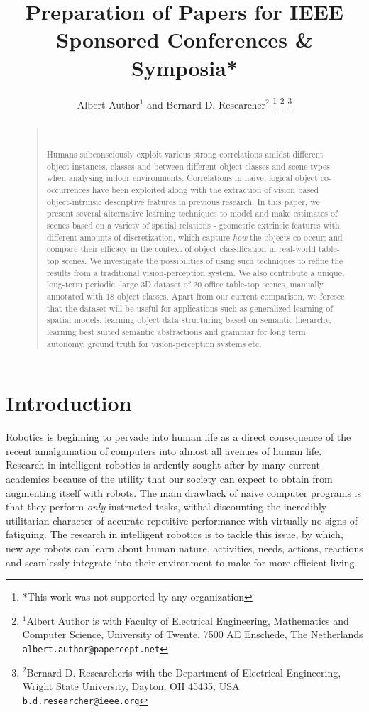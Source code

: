\documentclass[letterpaper, 10 pt, conference]{ieeeconf}  %
\title{\LARGE \bf
Preparation of Papers for IEEE Sponsored Conferences \& Symposia*
}
\author{Albert Author$^{1}$ and Bernard D. Researcher$^{2}$%
\thanks{*This work was not supported by any organization}%
\thanks{$^{1}$Albert Author is with Faculty of Electrical Engineering, Mathematics and Computer Science,
        University of Twente, 7500 AE Enschede, The Netherlands
        {\tt\small albert.author@papercept.net}}%
\thanks{$^{2}$Bernard D. Researcheris with the Department of Electrical Engineering, Wright State University,
        Dayton, OH 45435, USA
        {\tt\small b.d.researcher@ieee.org}}%
}
\begin{document}
\maketitle
\thispagestyle{empty}
\pagestyle{empty}


\begin{abstract}
\begin{quote}\

Humans subconsciously exploit various strong correlations amidst different object instances, classes and between different object classes and scene types when analysing indoor environments. Correlations in naive, logical object co-occurrences have been exploited along with the extraction of vision based object-intrinsic descriptive features in previous research. In this paper, we present several alternative learning techniques to model and make estimates of scenes based on a variety of spatial relations - geometric extrinsic features with different amounts of discretization, which capture \textit{how} the objects co-occur; and compare their efficacy in the context of object classification in real-world table-top scenes. We investigate the possibilities of using such techniques to refine the results from a traditional vision-perception system. We also contribute a unique, long-term periodic, large 3D dataset of 20 office table-top scenes, manually annotated with 18 object classes. Apart from our current comparison, we foresee that the dataset will be useful for applications such as generalized learning of spatial models, learning object data structuring based on semantic hierarchy, learning best suited semantic abstractions and grammar for long term autonomy, ground truth for vision-perception systems etc.
\end{quote}
\end{abstract}

\section{Introduction}
\label{sec:Introduction}


Robotics is beginning to pervade into human life as a direct consequence of the recent amalgamation of computers into almost all avenues of human life. Research in intelligent robotics is ardently sought after by many current academics because of the utility that our society can expect to obtain from augmenting itself with robots. The main drawback of naive computer programs is that they perform \emph{only} instructed tasks, withal discounting the incredibly utilitarian character of accurate repetitive performance with virtually no signs of fatiguing. The research in intelligent robotics is to tackle this issue, by which, new age robots can learn about human nature, activities, needs, actions, reactions and seamlessly integrate into their environment to make for more efficient living.
\end{document}
